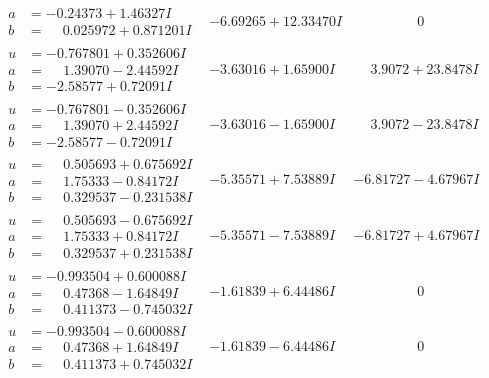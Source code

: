 \documentclass[1p]{elsarticle_modified}
\theoremstyle{definition}
\begin{document}
$$\begin{array}{c|c|c}
\begin{aligned}
a &= -0.24373 + 1.46327 I \\
b &= \phantom{-}0.025972 + 0.871201 I\end{aligned}
 & -6.69265 + 12.33470 I & \phantom{-0.000000 } 0 \\ \hline\begin{aligned}
u &= -0.767801 + 0.352606 I \\
a &= \phantom{-}1.39070 - 2.44592 I \\
b &= -2.58577 + 0.72091 I\end{aligned}
 & -3.63016 + 1.65900 I & \phantom{-}3.9072 + 23.8478 I \\ \hline\begin{aligned}
u &= -0.767801 - 0.352606 I \\
a &= \phantom{-}1.39070 + 2.44592 I \\
b &= -2.58577 - 0.72091 I\end{aligned}
 & -3.63016 - 1.65900 I & \phantom{-}3.9072 - 23.8478 I \\ \hline\begin{aligned}
u &= \phantom{-}0.505693 + 0.675692 I \\
a &= \phantom{-}1.75333 - 0.84172 I \\
b &= \phantom{-}0.329537 - 0.231538 I\end{aligned}
 & -5.35571 + 7.53889 I & -6.81727 - 4.67967 I \\ \hline\begin{aligned}
u &= \phantom{-}0.505693 - 0.675692 I \\
a &= \phantom{-}1.75333 + 0.84172 I \\
b &= \phantom{-}0.329537 + 0.231538 I\end{aligned}
 & -5.35571 - 7.53889 I & -6.81727 + 4.67967 I \\ \hline\begin{aligned}
u &= -0.993504 + 0.600088 I \\
a &= \phantom{-}0.47368 - 1.64849 I \\
b &= \phantom{-}0.411373 - 0.745032 I\end{aligned}
 & -1.61839 + 6.44486 I & \phantom{-0.000000 } 0 \\ \hline\begin{aligned}
u &= -0.993504 - 0.600088 I \\
a &= \phantom{-}0.47368 + 1.64849 I \\
b &= \phantom{-}0.411373 + 0.745032 I\end{aligned}
 & -1.61839 - 6.44486 I & \phantom{-0.000000 } 0 \\ \hline\begin{aligned}

\end{aligned}
\end{array}$$
\end{document}
